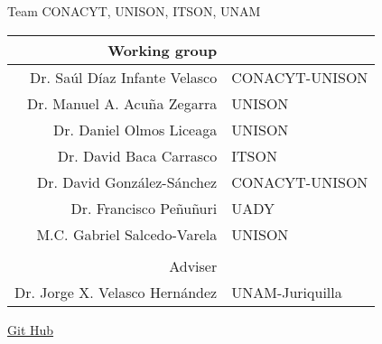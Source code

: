 \begin{frame}{Team CONACYT, UNISON, ITSON, UNAM }
    \begin{center}
        \begin{tabular}{rl}
            Working group
            \\
            \midrule
            Dr. Saúl Díaz Infante Velasco
            &
                CONACYT-UNISON
            \\
            Dr. Manuel A. Acu\~na Zegarra
            &
                UNISON
            \\
            Dr. Daniel Olmos Liceaga
            &
                UNISON
            \\
            Dr. David Baca Carrasco
            &
                ITSON
           \\
           Dr. David Gonz\'alez-S\'anchez
            &
            CONACYT-UNISON
           \\
           Dr. Francisco Pe\~nu\~nuri
           & UADY
           \\
            M.C. Gabriel Salcedo-Varela
            & UNISON
            \\
            \\
           Adviser
           \\
           \midrule
            Dr. Jorge X. Velasco Hern\'andez
            &
            UNAM-Juriquilla
        \end{tabular}
    \end{center}
	\href{https://github.com/SaulDiazInfante/Beamer-xxxi-semana-unison-2021-AppliedMathematicsWorkshop.git}{Git Hub}	
	
\end{frame}